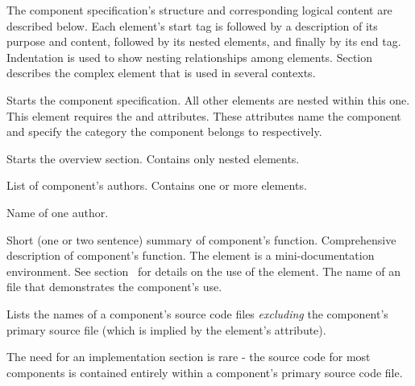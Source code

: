 \documentclass[11pt]{article}
\begin{document}
The component specification's \xml{} structure and corresponding
logical content are described below.  Each element's start tag is followed by a
description of its purpose and content, followed by its nested elements,
and finally by its end tag.  Indentation is used to show nesting
relationships among elements. Section~\sechyperref{\SUBSECdescElement} describes the complex  element that is used in several contexts.

\begin{description}
   Starts the component specification.  All
  other elements are nested within this one.  This element requires the
   and  attributes.  These
  attributes name the component and specify
  the category the component belongs to respectively.
  \begin{description}
     Starts the overview section.  Contains only
    nested elements.
    \begin{description}
        List of component's authors.  Contains one or more
       elements.
      \begin{description}
         Name of one author.
      \end{description}
       Short (one or two sentence) summary of component's
      function. 
       Comprehensive description of component's
      function.  The  element is a mini-documentation
      environment.  See
      section~\sechyperref{\SUBSECdescElement}
      for details on the use of the  element.
       The name of an  file that
      demonstrates the component's use.
    \end{description}
     Lists the names of
    a component's source code files \emph{excluding} the component's
    primary source file (which is implied by the 
    element's  attribute).
    
    The need for an implementation section is rare - the source code for
    most components is contained entirely within a component's primary 
    source code file.
    

\end{description}
\end{description}
\end{document}
